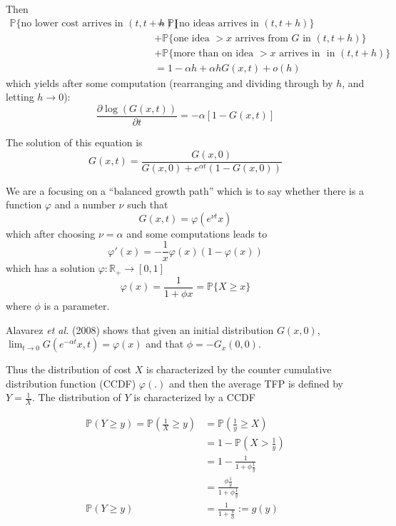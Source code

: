 \documentclass[12pt]{article}
\newcommand{\dpp}[2]{\frac{\partial #1}{\partial #2}}
\begin{document}
Then
\begin{align*}
\mathbb{P} \{ \text{no lower cost arrives in } (t,t+h) \} &=  \mathbb{P} \{ \text{no ideas arrives in } (t,t+h) \} \\
&+ \mathbb{P} \{ \text{one idea } > x \text{ arrives from } G \text{ in }  (t,t+h) \} \\
&+ \mathbb{P} \{ \text{more than on idea } > x \text{ arrives in } \text{ in }  (t,t+h) \} \\
&= 1 - \alpha h + \alpha h G(x,t) + o(h)
\end{align*}
which yields after some computation (rearranging and dividing through by $h$, and letting $ h \rightarrow 0$):
\begin{equation*}
\dpp{\log(G(x,t))}{t}= - \alpha [ 1-G(x,t) ] 
\end{equation*}

The solution of this equation is 
\begin{equation*}
G(x,t) = \frac{G(x,0)}{G(x,0)+ e^{\alpha t}(1-G(x,0))} 
\end{equation*}

We are a focusing on a ``balanced growth path'' which is to say whether there is a function $\varphi$ and a number $\nu$ such that
\begin{equation*}
G(x,t)=\varphi(e^{\nu t} x) 
\end{equation*}
which after choosing $\nu=\alpha$  and some computations leads to
\begin{equation*}
\varphi'(x)=-\frac{1}{x} \varphi(x)(1-\varphi(x))
\end{equation*}
which has a solution $\varphi : \mathbb{R}_+ \rightarrow [0,1]$
\begin{equation*}
\varphi(x)=\frac{1}{1+\phi x}  = \mathbb{P} \{ X \geq x\}
\end{equation*}
where $\phi$ is a parameter.

Alavarez \emph{et al.} (2008) shows that given an initial distribution $G(x,0)$, $\lim_{t\rightarrow 0} G(e^{-\alpha t}x,t) = \varphi (x)$ and that $\phi = -G_x(0,0)$.

Thus the distribution of cost $X$ is characterized by the counter cumulative distribution function (CCDF) $\varphi(.)$ and then the average TFP is defined by $Y=\tfrac{1}{X}$. The distribution of $Y$ is characterized by a CCDF 

\begin{align*}
\mathbb{P} (Y \geq y) = \mathbb{P} (\frac{1}{X}\geq y) &= \mathbb{P} (\frac{1}{y}\geq X) \\
&= 1 - \mathbb{P} ( X >  \frac{1}{y}) \\
&= 1 - \frac{1}{1+ \phi \frac{1}{y}} \\
&= \frac{\phi \frac{1}{y} }{1+ \phi \frac{1}{y}} \\
\mathbb{P} (Y \geq y) &= \frac{1}{1+ \frac{y}{\phi}} := g(y)
\end{align*}
\end{document}
